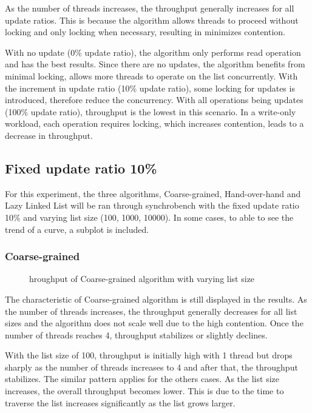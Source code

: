 \documentclass[12pt,a4paper]{article}
\begin{document}
As the number of threads increases, the throughput generally increases for all update ratios. This is because the algorithm allows threads to proceed without locking and only locking when necessary, resulting in minimizes contention. 

With no update (0\% update ratio), the algorithm only performs read operation and has the best results. Since there are no updates, the algorithm benefits from minimal locking, allows more threads to operate on the list concurrently. With the increment in update ratio (10\% update ratio), some locking for updates is introduced, therefore reduce the concurrency. With all operations being updates (100\% update ratio), throughput is the lowest in this scenario. In a write-only workload, each operation requires locking, which increases contention, leads to a decrease in throughput.

\subsection{Fixed update ratio 10\%}
For this experiment, the three algorithms, Coarse-grained, Hand-over-hand and Lazy Linked List will be ran through synchrobench with the fixed update ratio 10\% and varying list size (100, 1000, 10000). In some cases, to able to see the trend of a curve, a subplot is included.

\subsubsection{Coarse-grained}
\begin{figure}[h]
    \centering
    \qquad
    \qquad
    \caption{hroughput of Coarse-grained algorithm with varying list size}%
    \label{fig:fixed_update_coarse_grained}%
\end{figure}

The characteristic of Coarse-grained algorithm is still displayed in the results. As the number of threads increases, the throughput generally decreases for all list sizes and the algorithm does not scale well due to the high contention. Once the number of threads reaches 4, throughput stabilizes or slightly declines.

With the list size of 100, throughput is initially high with 1 thread but drops sharply as the number of threads increases to 4 and after that, the throughput stabilizes. The similar pattern applies for the others cases. As the list size increases, the overall throughput becomes lower. This is due to the time to traverse the list increases significantly as the list grows larger. 
\end{document}
